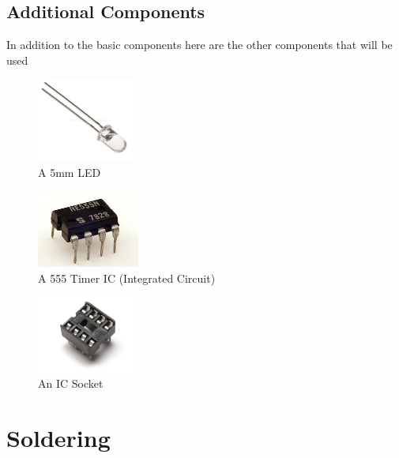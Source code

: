\documentclass{article}
\begin{document}
    
                    \subsection{Additional Components}
  
      In addition to the basic components here are the other components that will be used
      
\begin{figure}[H]
\caption{ A 5mm LED }
\label{fig:img/LED.jpg}
\centering
\includegraphics[width=0.3\textwidth]{img/LED.jpg}
\end{figure}

      
\begin{figure}[H]
\caption{ A 555 Timer IC (Integrated Circuit) }
\label{fig:img/555.jpg}
\centering
\includegraphics[width=0.3\textwidth]{img/555.jpg}
\end{figure}

      
\begin{figure}[H]
\caption{ An IC Socket }
\label{fig:img/IC_Socket.jpg}
\centering
\includegraphics[width=0.3\textwidth]{img/IC_Socket.jpg}
\end{figure}

    


  


  
              \section{Soldering}
  
\end{document}
